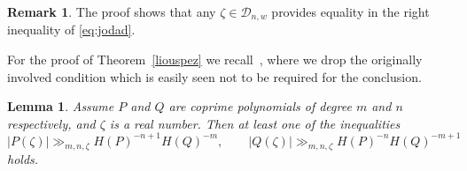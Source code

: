 \documentclass[12pt]{amsart}
\newtheorem{lemma}[theorem]{Lemma}
\theoremstyle{definition}
\newtheorem{remark}{Remark}
\begin{document}
\begin{remark}
The proof shows that any $\zeta\in\mathscr{D}_{n,w}$
provides equality in the right inequality of \eqref{eq:jodad}.
\end{remark}

For the proof of Theorem~\ref{liouspez} we recall~\cite[Lemma~3.1]{bschlei}, where we drop the originally
involved condition which is easily seen not to be 
required for the conclusion. 

\begin{lemma} \label{bslemma}
Assume $P$ and $Q$ are coprime polynomials of degree $m$ and $n$ respectively,
and $\zeta$ is a real number. Then
at least one of the inequalities
%
\begin{equation} \label{eq:nedwoa}
\vert P(\zeta)\vert\gg_{m,n,\zeta} H(P)^{-n+1}H(Q)^{-m}, \qquad \vert Q(\zeta)\vert\gg_{m,n,\zeta} H(P)^{-n}H(Q)^{-m+1}
\end{equation}
%
holds.
\end{lemma}
\end{document}
